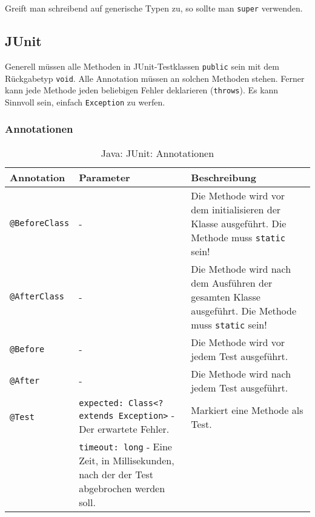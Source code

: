             \noindent Greift man schreibend auf generische Typen zu, so sollte man \texttt{super} verwenden.



    \subsection{JUnit}
        Generell müssen alle Methoden in JUnit-Testklassen \texttt{public} sein mit dem Rückgabetyp \texttt{void}. Alle Annotation müssen an solchen Methoden stehen. Ferner kann jede Methode jeden beliebigen Fehler deklarieren (\texttt{throws}). Es kann Sinnvoll sein, einfach \texttt{Exception} zu werfen.

        \subsubsection{Annotationen}
            \begin{sidewaystable}
                \centering
                \begin{tabular}{l | p{9cm} | p{10cm}}
                    Annotation & Parameter & Beschreibung \\
                    \hline
                    \texttt{@BeforeClass} & - & Die Methode wird vor dem initialisieren der Klasse ausgeführt. Die Methode muss \texttt{static} sein! \\
                    \texttt{@AfterClass} & - & Die Methode wird nach dem Ausführen der gesamten Klasse ausgeführt. Die Methode muss \texttt{static} sein! \\
                    \texttt{@Before} & - & Die Methode wird vor jedem Test ausgeführt. \\
                    \texttt{@After} & - & Die Methode wird nach jedem Test ausgeführt. \\
                    \texttt{@Test} & \texttt{expected: Class<? extends Exception>} - Der erwartete Fehler. & Markiert eine Methode als Test. \\
                    & \texttt{timeout: long} - Eine Zeit, in Millisekunden, nach der der Test abgebrochen werden soll. & \\
                \end{tabular}
                \caption{Java: JUnit: Annotationen}
            \end{sidewaystable}


